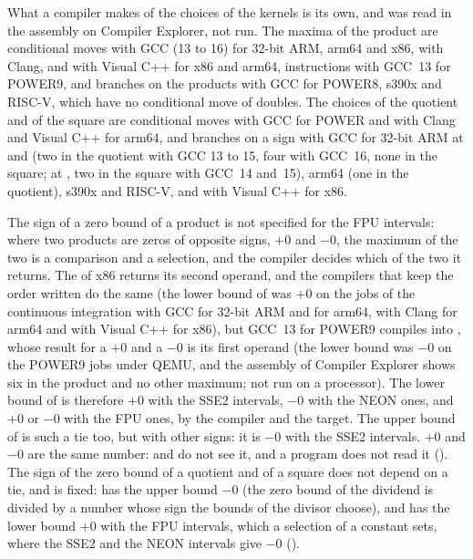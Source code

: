\medskip
What a compiler makes of the choices of the kernels is its own, and was read
in the assembly on Compiler Explorer, not run. The maxima of the product are
conditional moves with GCC (13 to 16) for 32-bit ARM, arm64 and x86, with
Clang, and with Visual C++ for x86 and arm64,  instructions
with GCC~13 for POWER9, and branches on the products with GCC for POWER8,
s390x and RISC-V, which have no conditional move of doubles. The choices of
the quotient and of the square are conditional moves with GCC for POWER and
with Clang and Visual C++ for arm64, and branches on a sign with GCC for
32-bit ARM at  and  (two in the quotient with GCC 13
to 15, four with GCC~16, none in the square; at , two in the
square with GCC~14 and~15), arm64 (one in the quotient), s390x and RISC-V,
and with Visual C++ for x86.

\begin{Rem}\label{rem:fpu-zero}
The sign of a zero bound of a product is not specified for the FPU
intervals: where two products are zeros of opposite signs, $+0$ and $-0$, the
maximum of the two is a comparison and a selection, and the compiler decides
which of the two it returns. The  of x86 returns its second
operand, and the compilers that keep the order written do the same (the lower
bound of \code{[-1, 0] * [-1, 0]} was $+0$ on the jobs of the continuous
integration with GCC for 32-bit ARM and for arm64, with Clang for arm64 and
with Visual C++ for x86), but GCC~13 for POWER9 compiles
 into , whose result for a $+0$ and a
$-0$ is its first operand (the lower bound was $-0$ on the POWER9 jobs under
QEMU, and the assembly of Compiler Explorer shows six  in the
product and no other maximum; not run on a processor). The lower bound of
\code{[-1, 0] * [-1, 0]} is therefore $+0$ with the SSE2 intervals, $-0$ with
the NEON ones, and $+0$ or $-0$ with the FPU ones, by the compiler and the
target. The upper bound of \code{[-1, 0] * [0, 1]} is such a tie too, but with
other signs: it is $-0$ with the SSE2 intervals. $+0$ and $-0$ are
the same number: \code{==} and \code{<} do not see it, and a program does not
read it (). The sign of the zero bound of a quotient and
of a square does not depend on a tie, and is fixed: \code{[0, 1] / [-2, -1]}
has the upper bound $-0$ (the zero bound of the dividend is divided by a
number whose sign the bounds of the divisor choose), and
 has the lower bound $+0$ with the FPU intervals,
which a selection of a constant sets, where the SSE2 and the NEON intervals
give $-0$ ().
\end{Rem}

